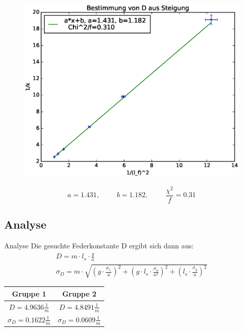 \documentclass[11pt]{beamer}
\begin{document}
\begin{frame}
\begin{figure}[H]
\centering
\includegraphics[scale=0.4]{Bilder/Bestimmung_D_linreg.eps}
\end{figure}

\begin{equation*}
a=1.431, \hspace{1cm} b=1.182, \hspace{1cm} \frac{\chi^2}{f}=0.31 
\end{equation*}

\end{frame}
\subsection{Analyse}
\begin{frame}{Analyse}
Die gesuchte Federkonstante D ergibt sich dann aus:
\begin{align*}
D=m \cdot l_s \cdot \frac{g}{a}\\
\sigma_D=m \cdot \sqrt{(g\cdot \frac{\sigma_{l_s}}{a})^2+(g\cdot l_s \cdot \frac{\sigma_a}{a^2})^2+(l_s \cdot \frac{\sigma_g}{a})^2}
\end{align*}
\begin{table}[H]\centering
\begin{tabular}{c|c}
Gruppe 1 & Gruppe 2\\ 
\hline
$D=4.9636\frac{1}{m}$& $D=4.8491 \frac{1}{m}$\\ 
$\sigma_D=0.1622 \frac{1}{m}$& $\sigma_D=0.0609 \frac{1}{m}$\\
\end{tabular} 
\end{table}
\end{frame}
\end{document}
